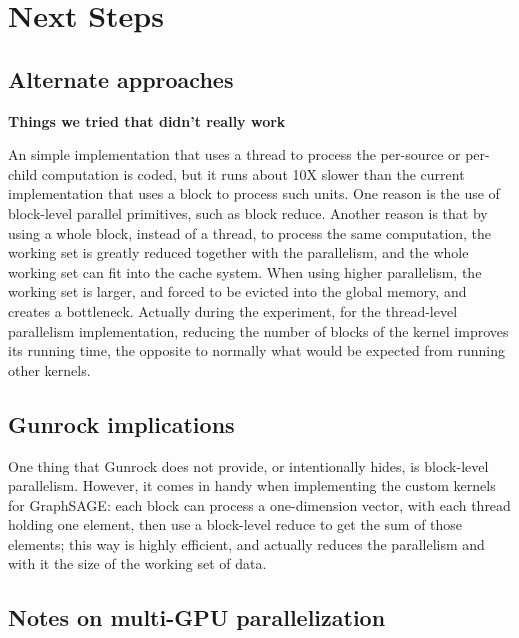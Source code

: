 \documentclass[10pt,oneside]{memoir}
\begin{document}
\hypertarget{next-steps-2}{%
\section{Next Steps}\label{next-steps-2}}

\hypertarget{alternate-approaches-1}{%
\subsection{Alternate approaches}\label{alternate-approaches-1}}

\textbf{Things we tried that didn't really work}

An simple implementation that uses a thread to process the per-source or
per-child computation is coded, but it runs about 10X slower than the
current implementation that uses a block to process such units. One
reason is the use of block-level parallel primitives, such as block
reduce. Another reason is that by using a whole block, instead of a
thread, to process the same computation, the working set is greatly
reduced together with the parallelism, and the whole working set can fit
into the cache system. When using higher parallelism, the working set is
larger, and forced to be evicted into the global memory, and creates a
bottleneck. Actually during the experiment, for the thread-level
parallelism implementation, reducing the number of blocks of the kernel
improves its running time, the opposite to normally what would be
expected from running other kernels.

\hypertarget{gunrock-implications-1}{%
\subsection{Gunrock implications}\label{gunrock-implications-1}}

One thing that Gunrock does not provide, or intentionally hides, is
block-level parallelism. However, it comes in handy when implementing
the custom kernels for GraphSAGE: each block can process a one-dimension
vector, with each thread holding one element, then use a block-level
reduce to get the sum of those elements; this way is highly efficient,
and actually reduces the parallelism and with it the size of the working
set of data.

\hypertarget{notes-on-multi-gpu-parallelization-2}{%
\subsection{Notes on multi-GPU
parallelization}\label{notes-on-multi-gpu-parallelization-2}}
\end{document}
